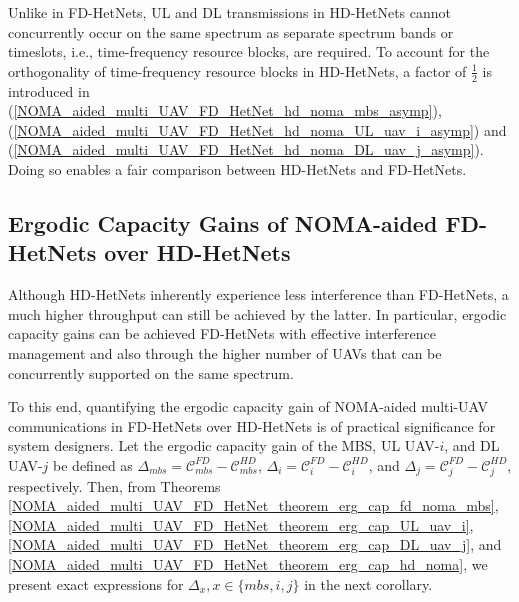 Unlike in FD-HetNets, UL and DL transmissions in HD-HetNets cannot concurrently occur on the same spectrum as separate spectrum bands or timeslots, i.e., time-frequency resource blocks, are required. To account for the orthogonality of time-frequency resource blocks in HD-HetNets, a factor of $\frac{1}{2}$ is introduced in (\ref{NOMA_aided_multi_UAV_FD_HetNet_hd_noma_mbs_asymp}), (\ref{NOMA_aided_multi_UAV_FD_HetNet_hd_noma_UL_uav_i_asymp}) and (\ref{NOMA_aided_multi_UAV_FD_HetNet_hd_noma_DL_uav_j_asymp}). Doing so enables a fair comparison between HD-HetNets and FD-HetNets.

\subsection{Ergodic Capacity Gains of NOMA-aided FD-HetNets over HD-HetNets}

Although HD-HetNets inherently experience less interference than FD-HetNets, a much higher throughput can still be achieved by the latter. In particular, ergodic capacity gains can be achieved FD-HetNets with effective interference management and also through the higher number of UAVs that can be concurrently supported on the same spectrum. 

To this end, quantifying the ergodic capacity gain of NOMA-aided multi-UAV communications in FD-HetNets over HD-HetNets is of practical significance for system designers. Let the ergodic capacity gain of the MBS, UL UAV-$i$, and DL UAV-$j$ be defined as $\Delta_{mbs} = \mathcal{C}_{mbs}^{FD} - \mathcal{C}_{mbs}^{HD}$, $\Delta_{i} = \mathcal{C}_{i}^{FD} - \mathcal{C}_{i}^{HD}$, and $\Delta_{j} = \mathcal{C}_{j}^{FD} - \mathcal{C}_{j}^{HD}$, respectively. Then, from Theorems \ref{NOMA_aided_multi_UAV_FD_HetNet_theorem_erg_cap_fd_noma_mbs}, \ref{NOMA_aided_multi_UAV_FD_HetNet_theorem_erg_cap_UL_uav_i}, \ref{NOMA_aided_multi_UAV_FD_HetNet_theorem_erg_cap_DL_uav_j}, and \ref{NOMA_aided_multi_UAV_FD_HetNet_theorem_erg_cap_hd_noma}, we present exact expressions for $\Delta_{x}, x \in \{mbs, i, j\}$ in the next corollary.

